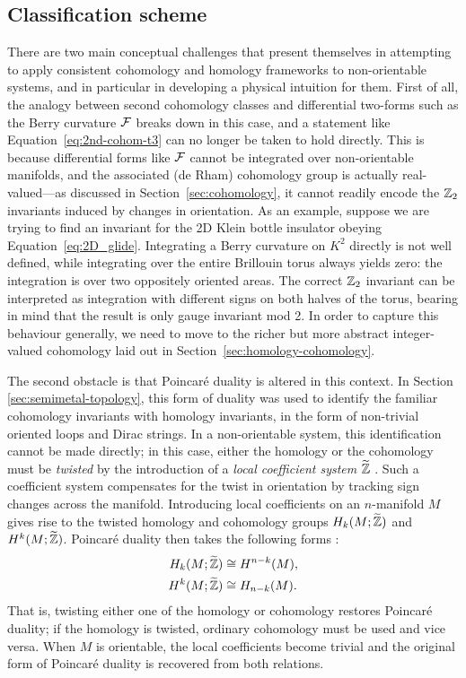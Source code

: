 \subsection{Classification scheme}

There are two main conceptual challenges that present themselves in attempting to apply consistent cohomology and homology frameworks to non-orientable systems, and in particular in developing a physical intuition for them. First of all, the analogy between second cohomology classes and differential two-forms such as the Berry curvature $\mathcal{F}$ breaks down in this case, and a statement like Equation~\eqref{eq:2nd-cohom-t3} can no longer be taken to hold directly. This is because differential forms like $\mathcal{F}$ cannot be integrated over non-orientable manifolds, and the associated (de Rham) cohomology group is actually real-valued---as discussed in Section~\ref{sec:cohomology}, it cannot readily encode the $\mathbb{Z}_2$ invariants induced by changes in orientation. As an example, suppose we are trying to find an invariant for the 2D Klein bottle insulator obeying Equation~\eqref{eq:2D_glide}. Integrating a Berry curvature on $K^2$ directly is not well defined, while integrating over the entire Brillouin torus always yields zero: the integration is over two oppositely oriented areas. The correct $\mathbb{Z}_2$ invariant can be interpreted as integration with different signs on both halves of the torus, bearing in mind that the result is only gauge invariant mod 2. In order to capture this behaviour generally, we need to move to the richer but more abstract integer-valued cohomology laid out in Section~\ref{sec:homology-cohomology}.

The second obstacle is that Poincaré duality is altered in this context. In Section \ref{sec:semimetal-topology}, this form of duality was used to identify the familiar cohomology invariants with homology invariants, in the form of non-trivial oriented loops and Dirac strings. In a non-orientable system, this identification cannot be made directly; in this case, either the homology or the cohomology must be \emph{twisted} by the introduction of a \emph{local coefficient system} $\widetilde{\mathbb{Z}}$ \cite{Whitehead_Homotopy,Hatcher_algebraic-topology}. Such a coefficient system compensates for the twist in orientation by tracking sign changes across the manifold. Introducing local coefficients on an $n$-manifold $M$ gives rise to the twisted homology and cohomology groups $H_k(M;\widetilde{\mathbb{Z}})$ and $H^k(M;\widetilde{\mathbb{Z}})$. Poincaré duality then takes the following forms \parencite[Theorem 3H.6]{Hatcher_algebraic-topology}:
\begin{align*}
	H_k(M;\widetilde{\mathbb{Z}}) &\cong H^{n-k}(M), \\
	H^k(M;\widetilde{\mathbb{Z}}) &\cong H_{n-k}(M).
\end{align*}
That is, twisting either one of the homology or cohomology restores Poincaré duality; if the homology is twisted, ordinary cohomology must be used and vice versa. When $M$ is orientable, the local coefficients become trivial and the original form of Poincaré duality is recovered from both relations.

